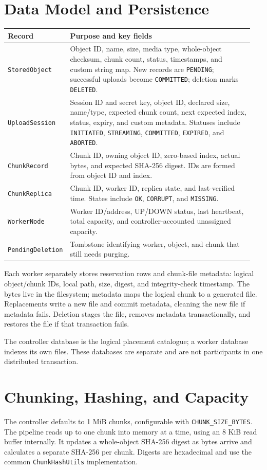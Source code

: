 \documentclass[11pt,a4paper]{article}
\begin{document}
\section{Data Model and Persistence}
\begin{longtable}{p{0.20\linewidth}p{0.75\linewidth}}
\toprule \textbf{Record} & \textbf{Purpose and key fields}\\ \midrule
\endhead
\texttt{StoredObject} & Object ID, name, size, media type, whole-object checksum, chunk count, status, timestamps, and custom string map. New records are \texttt{PENDING}; successful uploads become \texttt{COMMITTED}; deletion marks \texttt{DELETED}.\\
\texttt{UploadSession} & Session ID and secret key, object ID, declared size, name/type, expected chunk count, next expected index, status, expiry, and custom metadata. Statuses include \texttt{INITIATED}, \texttt{STREAMING}, \texttt{COMMITTED}, \texttt{EXPIRED}, and \texttt{ABORTED}.\\
\texttt{ChunkRecord} & Chunk ID, owning object ID, zero-based index, actual bytes, and expected SHA-256 digest. IDs are formed from object ID and index.\\
\texttt{ChunkReplica} & Chunk ID, worker ID, replica state, and last-verified time. States include \texttt{OK}, \texttt{CORRUPT}, and \texttt{MISSING}.\\
\texttt{WorkerNode} & Worker ID/address, UP/DOWN status, last heartbeat, total capacity, and controller-accounted unassigned capacity.\\
\texttt{PendingDeletion} & Tombstone identifying worker, object, and chunk that still needs purging.\\
\bottomrule
\end{longtable}
Each worker separately stores reservation rows and chunk-file metadata: logical object/chunk IDs, local path, size, digest, and integrity-check timestamp. The bytes live in the filesystem; metadata maps the logical chunk to a generated file. Replacements write a new file and commit metadata, cleaning the new file if metadata fails. Deletion stages the file, removes metadata transactionally, and restores the file if that transaction fails.

The controller database is the logical placement catalogue; a worker database indexes its own files. These databases are separate and are not participants in one distributed transaction.

\section{Chunking, Hashing, and Capacity}
The controller defaults to 1 MiB chunks, configurable with \texttt{CHUNK\_SIZE\_BYTES}. The pipeline reads up to one chunk into memory at a time, using an 8 KiB read buffer internally. It updates a whole-object SHA-256 digest as bytes arrive and calculates a separate SHA-256 per chunk. Digests are hexadecimal and use the common \texttt{ChunkHashUtils} implementation.
\end{document}
